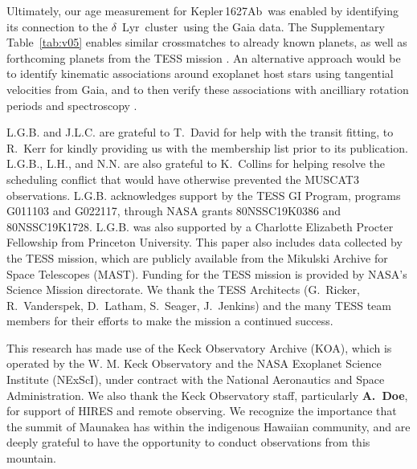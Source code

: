 \documentclass[12pt,modern,twocolumn,tighten]{aastex63}
\newcommand{\cn}{$\delta$\ Lyr\ cluster} %
\newcommand{\pn}{Kepler\,1627Ab} %
\begin{document}
Ultimately, our age measurement for \pn\ was enabled by identifying
its connection to the \cn\ using the Gaia data.  The Supplementary
Table~\ref{tab:v05} enables similar crossmatches to already known
planets, as well as forthcoming planets from the TESS mission
\citep{ricker_transiting_2015,guerrero_tess_2021}.  An alternative
approach would be to identify kinematic associations around exoplanet
host stars using tangential velocities from Gaia, and to then verify these associations
with ancilliary rotation periods and spectroscopy
\citep{tofflemire_tess_2021}.




\acknowledgements
\raggedbottom

L.G.B{.} and J.L.C{.} are grateful to T{.}~David for help with the
transit fitting, to R{.}~Kerr for kindly providing us with the
\citet{kerr_stars_2021} membership list prior to its publication.
L.G.B{.}, L.H{.}, and N.N{.} are also grateful to K{.}~Collins for
helping resolve the scheduling conflict that would have otherwise
prevented the MUSCAT3 observations.
%
L.G.B{.} acknowledges support by the TESS GI Program, programs
G011103 and G022117, through NASA grants 80NSSC19K0386 and
80NSSC19K1728.
%
L.G.B{.} was also supported by a Charlotte Elizabeth Procter
Fellowship from Princeton University.
%
%
This paper also includes data collected by the TESS mission, which are
publicly available from the Mikulski Archive for Space Telescopes
(MAST).
%
Funding for the TESS mission is provided by NASA's Science Mission
directorate.
%
We thank the TESS Architects (G.~Ricker, R.~Vanderspek, D.~Latham,
S.~Seager, J.~Jenkins) and the many TESS team members for their
efforts to make the mission a continued success.
%

%
%
%
This research has made use of the Keck Observatory Archive (KOA),
which is operated by the W. M. Keck Observatory and the NASA Exoplanet
Science Institute (NExScI), under contract with the National
Aeronautics and Space Administration.
We also thank
the Keck Observatory staff, particularly {\bf A.~Doe},
for support of HIRES and remote observing.  We recognize
the importance
that the summit of Maunakea has within the indigenous
Hawaiian community, and are deeply grateful to
have the opportunity to conduct observations from this
mountain.
%
\end{document}
